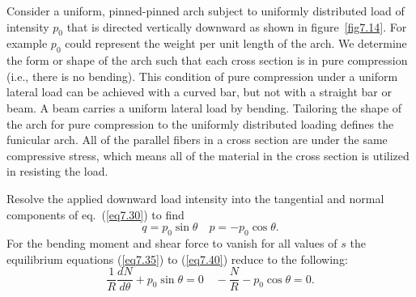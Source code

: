 \documentclass{AeroStructure-ERJohnson}
\begin{document}
\begin{example}\label{ex7.5}Consider a uniform, pinned-pinned arch subject to uniformly distributed load of intensity $p_0$ that is directed vertically downward as shown in figure~\ref{fig7.14}. For example $p_0$ could represent the weight per unit length of the arch. We determine the form or shape of the arch such that each cross section is in pure compression (i.e., there is no bending). This condition of pure compression under a uniform lateral load can be achieved with a curved bar, but not with a straight bar or beam. A beam carries a uniform lateral load by bending. Tailoring the shape of the arch for pure compression to the uniformly distributed loading defines the funicular arch. All of the parallel fibers in a cross section are under the same compressive stress, which means all of the material in the cross section is utilized in resisting the load.

{\def\thefigure{7.14}
}


Resolve the applied downward load intensity into the tangential and normal components of eq.~(\ref{eq7.30}) to find
\begin{equation}
q=p_{0} \sin \theta \quad p=-p_{0} \cos \theta. \label{eq7.5.a}\tag{a}
\end{equation}
For the bending moment and shear force to vanish for all values of $s$ the equilibrium equations (\ref{eq7.35}) to (\ref{eq7.40}) reduce to the following:
\begin{equation}
\frac{1}{R} \frac{d N}{d \theta}+p_{0} \sin \theta=0 \quad-\frac{N}{R}-p_{0} \cos \theta=0. \label{eq7.5.b}\tag{b}
\end{equation}
\vadjust{\pagebreak}


\end{example}
\end{document}
